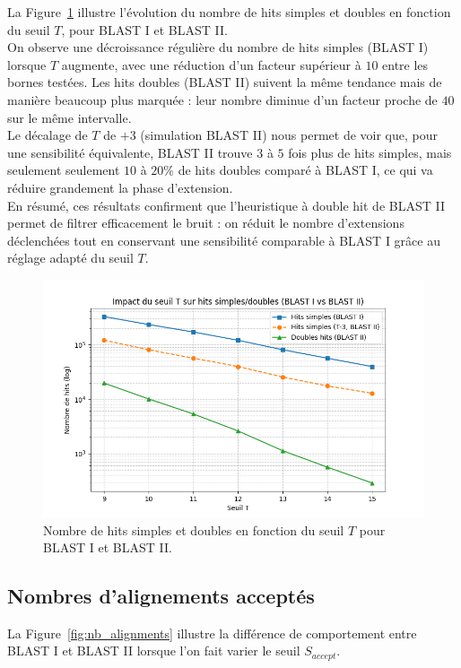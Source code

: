 \documentclass[conference]{IEEEtran}
\begin{document}
La Figure~\ref{fig:test_T} illustre l’évolution du nombre de hits simples et doubles en fonction du seuil $T$, pour BLAST I et BLAST II.\\
On observe une décroissance régulière du nombre de hits simples (BLAST I) lorsque $T$ augmente, avec une réduction d’un facteur supérieur à $10$ entre les bornes testées. Les hits doubles (BLAST II) suivent la même tendance mais de manière beaucoup plus marquée : leur nombre diminue d’un facteur proche de $40$ sur le même intervalle.\\
Le décalage de $T$ de $+3$ (simulation BLAST II) nous permet de voir que, pour une sensibilité équivalente, BLAST II trouve $3$ à $5$ fois plus de hits simples, mais seulement seulement $10$ à $20\%$ de hits doubles comparé à BLAST I, ce qui va réduire grandement la phase d'extension.\\
En résumé, ces résultats confirment que l’heuristique à double hit de BLAST II permet de filtrer efficacement le bruit : on réduit le nombre d’extensions déclenchées tout en conservant une sensibilité comparable à BLAST I grâce au réglage adapté du seuil $T$.

\begin{figure}
    \centering
    \includegraphics[width=\linewidth]{test_T.png}
    \caption{Nombre de hits simples et doubles en fonction du seuil $T$ pour BLAST I et BLAST II.}
    \label{fig:test_T}
\end{figure}


\subsection{Nombres d'alignements acceptés}

La Figure~\ref{fig:nb_alignments} illustre la différence de comportement entre BLAST I et BLAST II lorsque l’on fait varier le seuil $S_{accept}$.
\end{document}
